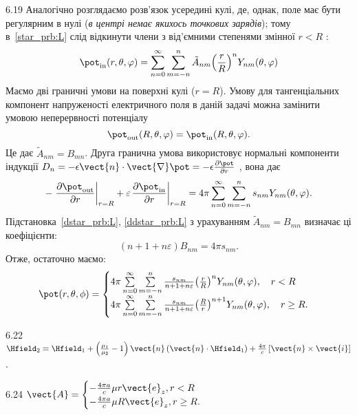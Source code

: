 \begin{Solution}{6.{19}}
	Аналогічно розглядаємо розв’язок усередині кулі, де, однак, поле має бути регулярним в нулі (\emph{в центрі немає якихось точкових зарядів}); тому в~\eqref{star_prb:L} слід відкинути члени з від'ємними степенями змінної $r < R$ :
	\begin{equation}\label{ddstar_prb:L}
		\pot_\mathrm{in}(r,\theta ,\varphi ) = \sum\limits_{n = 0}^\infty  {\sum\limits_{m =  - n}^n {{{\tilde A}_{nm}}{{\left( {\frac{r}{R}} \right)}^n}{Y_{nm}}(\theta ,\varphi )} }
	\end{equation}
	Маємо дві граничні умови на поверхні кулі ($r = R$). Умову для тангенціальних компонент напруженості електричного поля в даній задачі можна замінити умовою неперервності потенціалу
	\[
		\pot_\mathrm{out}(R,\theta ,\varphi ) = {\pot_\mathrm{in}}(R,\theta ,\varphi ).
	\]
	Це дає  $\tilde{A}_{nm} = B_{mn}$.
	Друга гранична умова використовує нормальні компоненти індукції $D_n =  - \epsilon \vect{n} \cdot \vect{\nabla}\pot  =  - \epsilon \frac{\partial \pot }{\partial r}$ , вона дає
	\[
		- \left. {\frac{{\partial {\pot_\mathrm{out}}}}{{\partial r}}} \right|_{r = R} + \varepsilon {\left. {\frac{{\partial {\pot_\mathrm{in}}}}{{\partial r}}} \right|_{r = R}} = 4\pi \sum\limits_{n = 0}^\infty  {\sum\limits_{m =  - n}^n {{s_{nm}}{Y_{nm}}(\theta ,\varphi )} }.
	\]
	Підстановка~\eqref{dstar_prb:L}, \eqref{ddstar_prb:L} з урахуванням  $\tilde{A}_{nm} = B_{mn}$ визначає ці коефіцієнти:
	\[
		\left( n + 1 + n\varepsilon  \right)B_{nm} = 4\pi s_{nm}.
	\]
	Отже, остаточно маємо:
	\[
		\pot(r,\theta,\phi) =
		\begin{cases}
			4\pi \sum\limits_{n = 0}^\infty  {\sum\limits_{m =  - n}^n {\frac{{{s_{nm}}}}{{n + 1 + n\varepsilon }}{{\left( {\frac{r}{R}} \right)}^n}{Y_{nm}}(\theta ,\varphi )} } , \quad r < R \\
			4\pi \sum\limits_{n = 0}^\infty  {\sum\limits_{m =  - n}^n {\frac{{{s_{nm}}}}{{n + 1 + n\varepsilon }}{{\left( {\frac{R}{r}} \right)}^{n + 1}}{Y_{nm}}(\theta ,\varphi )} } , \quad r \ge R.
		\end{cases}
	\]

\end{Solution}
\begin{Solution}{6.{22}}
    $\Hfield_2 = \Hfield_1 + \left( \frac{\mu_1}{\mu_2} - 1 \right)\vect{n}\left( \vect{n} \cdot \Hfield_1 \right) + \frac{4\pi}{c}\left[\vect{n}\times\vect{i}\right] $.
\end{Solution}
\begin{Solution}{6.{24}}
	$\vect{A} =
		\begin{cases}
			-\frac{4\pi a}{c}\mu r \vect{e}_z, r < R \\
			-\frac{4\pi a}{c}\mu R \vect{e}_z, r \ge R.
		\end{cases}
	$
\end{Solution}
